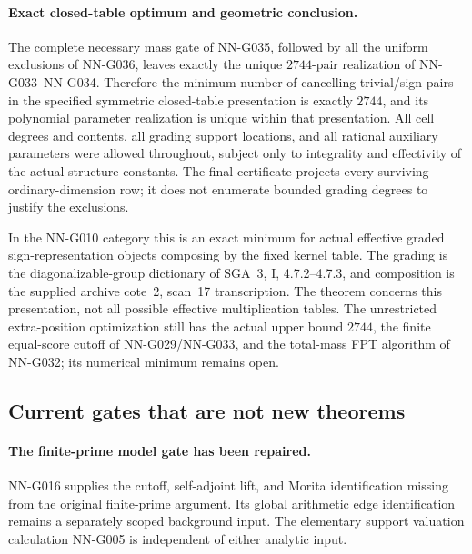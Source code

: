 \paragraph{Exact closed-table optimum and geometric conclusion.}
The complete necessary mass gate of NN-G035,
followed by all the uniform exclusions of NN-G036,
leaves exactly the unique $2744$-pair realization
of NN-G033--NN-G034. Therefore the minimum number
of cancelling trivial/sign pairs in the specified
symmetric closed-table presentation is exactly
$2744$, and its polynomial parameter realization
is unique within that presentation.
All cell degrees and contents, all grading support
locations, and all rational auxiliary parameters
were allowed throughout, subject only to integrality
and effectivity of the actual structure constants.
The final certificate projects every surviving
ordinary-dimension row; it does not enumerate
bounded grading degrees to justify the exclusions.

In the NN-G010 category this is an exact minimum
for actual effective graded sign-representation
objects composing by the fixed kernel table.
The grading is the diagonalizable-group dictionary
of SGA~3, I, 4.7.2--4.7.3, and composition is
the supplied archive cote~2, scan~17 transcription.
The theorem concerns this presentation, not all
possible effective multiplication tables.
The unrestricted extra-position optimization still
has the actual upper bound $2744$, the finite
equal-score cutoff of NN-G029/NN-G033, and the
total-mass FPT algorithm of NN-G032; its numerical
minimum remains open.


\subsection{Current gates that are not new theorems}
\paragraph{The finite-prime model gate has been repaired.}
NN-G016 supplies the cutoff, self-adjoint lift, and Morita
identification missing from the original finite-prime argument.
Its global arithmetic edge identification remains a separately
scoped background input. The elementary support valuation
calculation NN-G005 is independent of either analytic input.

